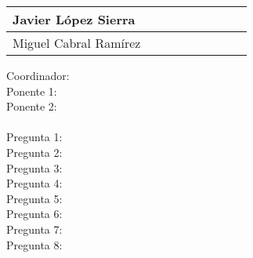 \begin{table}[h]
{\begin{tabular}{|l|l|l|l|l|l|l|l|l|}
Javier López Sierra                                                &                                                                  &                                                                  &                                                                  &                                                                  &                                                                  &                                                                  &                                                                  &                                                                  \\ \hline
Miguel Cabral Ramírez                                              &                                                                  &                                                                  &                                                                  &                                                                  &                                                                  &                                                                  &                                                                  &                                                                  \\ \hline
\end{tabular}%
}
\end{table}
\noindent
Coordinador: \\
Ponente 1: \\
Ponente 2: \\
\bigskip \\
Pregunta 1: \\
Pregunta 2: \\
Pregunta 3: \\
Pregunta 4: \\
Pregunta 5: \\
Pregunta 6: \\
Pregunta 7: \\
Pregunta 8: \\